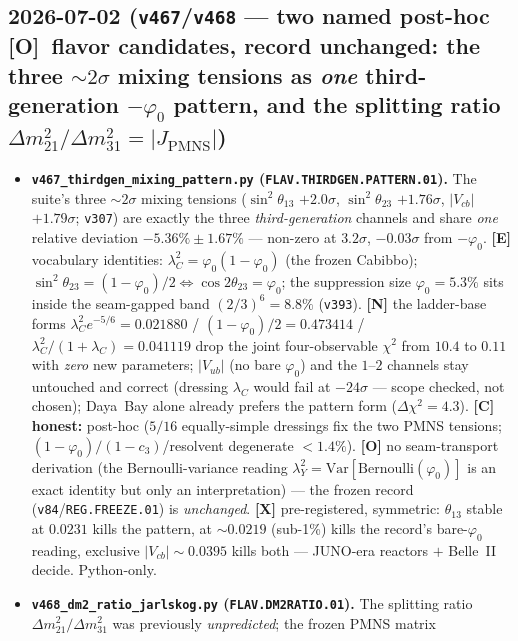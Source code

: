 \documentclass[11pt]{article}
\providecommand{\mO}{\textbf{[O]}}\providecommand{\mX}{\textbf{[X]}}
\begin{document}
\subsection*{2026-07-02 (\texttt{v467}/\texttt{v468} --- two named post-hoc \mO\ flavor candidates, record unchanged: the three ${\sim}2\sigma$ mixing tensions as \emph{one} third-generation $-\varphi_0$ pattern, and the splitting ratio $\Delta m^2_{21}/\Delta m^2_{31}=|J_{\mathrm{PMNS}}|$)}
\begin{itemize}
\item \textbf{\texttt{v467\_thirdgen\_mixing\_pattern.py} (\texttt{FLAV.THIRDGEN.PATTERN.01}).} The suite's
three ${\sim}2\sigma$ mixing tensions ($\sin^2\theta_{13}$ $+2.0\sigma$, $\sin^2\theta_{23}$ $+1.76\sigma$,
$|V_{cb}|$ $+1.79\sigma$; \texttt{v307}) are exactly the three \emph{third-generation} channels and share
\emph{one} relative deviation $-5.36\%\pm1.67\%$ --- non-zero at $3.2\sigma$, $-0.03\sigma$ from $-\varphi_0$.
\textbf{[E]} vocabulary identities: $\lambda_C^2{=}\varphi_0(1{-}\varphi_0)$ (the frozen Cabibbo);
$\sin^2\theta_{23}{=}(1{-}\varphi_0)/2\Leftrightarrow\cos2\theta_{23}{=}\varphi_0$; the suppression size
$\varphi_0{=}5.3\%$ sits inside the seam-gapped band $(2/3)^6{=}8.8\%$ (\texttt{v393}). \textbf{[N]} the
ladder-base forms $\lambda_C^2e^{-5/6}{=}0.021880$ / $(1{-}\varphi_0)/2{=}0.473414$ /
$\lambda_C^2/(1{+}\lambda_C){=}0.041119$ drop the joint four-observable $\chi^2$ from $10.4$ to $0.11$ with
\emph{zero} new parameters; $|V_{ub}|$ (no bare $\varphi_0$) and the $1$--$2$ channels stay untouched and
correct (dressing $\lambda_C$ would fail at $-24\sigma$ --- scope checked, not chosen); Daya~Bay alone already
prefers the pattern form ($\Delta\chi^2{=}4.3$). \textbf{[C] honest:} post-hoc ($5/16$ equally-simple dressings
fix the two PMNS tensions; $(1{-}\varphi_0)/(1{-}c_3)$/resolvent degenerate ${<}1.4\%$). \textbf{[O]} no
seam-transport derivation (the Bernoulli-variance reading $\lambda_Y^2{=}\mathrm{Var}[\mathrm{Bernoulli}(\varphi_0)]$
is an exact identity but only an interpretation) --- the frozen record (\texttt{v84}/\texttt{REG.FREEZE.01})
is \emph{unchanged}. \textbf{[X]} pre-registered, symmetric: $\theta_{13}$ stable at $0.0231$ kills the pattern,
at ${\sim}0.0219$ (sub-1\%) kills the record's bare-$\varphi_0$ reading, exclusive $|V_{cb}|{\sim}0.0395$ kills
both --- JUNO-era reactors $+$ Belle~II decide. Python-only.
\item \textbf{\texttt{v468\_dm2\_ratio\_jarlskog.py} (\texttt{FLAV.DM2RATIO.01}).} The splitting ratio
$\Delta m^2_{21}/\Delta m^2_{31}$ was previously \emph{unpredicted}; the frozen PMNS matrix

\end{itemize}
\end{document}
